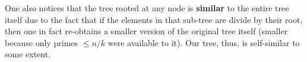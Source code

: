 \documentclass{article}
\begin{document}
One also notices that the tree rooted at any node is \textbf{similar} to the entire tree itself due to the fact that if the elements in that sub-tree are divide by their root, then one in fact re-obtains a smaller version of the original tree itself (smaller because only primes $\leq n/k$ were available to it). Our tree, thus, is self-similar to some extent.
\end{document}
